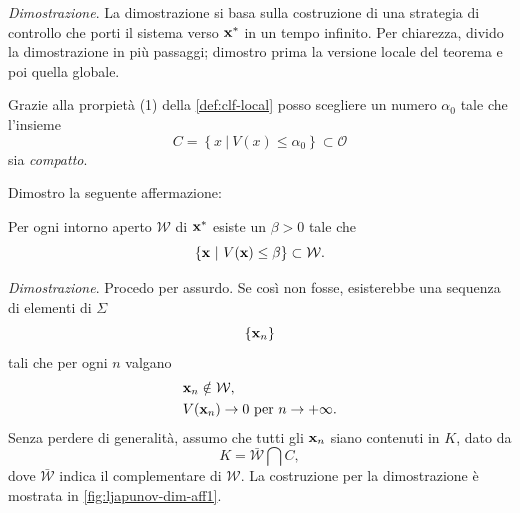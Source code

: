 \emph{Dimostrazione}.
La dimostrazione si basa sulla costruzione di una strategia di
controllo che porti il sistema verso $\mathbf{x}^*$ in un tempo infinito.
Per chiarezza, divido la dimostrazione in più passaggi; dimostro prima la versione locale
del teorema e poi quella globale.
\begin{steps}
    \item Grazie alla prorpietà (1) della \autoref{def:clf-local}
    posso scegliere un numero $\alpha_0$ tale che l'insieme
    \begin{equation}
        C = \left\{ x\ |\ V(x) \leq \alpha_0 \right\} \subset \mathcal O
        \label{eq:alpha_0}
    \end{equation}
    sia \emph{compatto}.

    Dimostro la seguente affermazione:

    \begin{aff}
        Per ogni intorno aperto $\mathcal W$ di $\mathbf{x}^*$ esiste
        un $\beta > 0$ tale che
        \begin{equation*}
            \{\mathbf{x}\ |\ V(\mathbf{x}) \leq \beta\} \subset \mathcal W.
        \end{equation*}
    \end{aff}

    \emph{Dimostrazione}.
    Procedo per assurdo.
    Se così non fosse, esisterebbe una sequenza di elementi di $\Sigma$
    \begin{equation*}
    \{\mathbf{x}_n\}
    \end{equation*}
    tali che per ogni $n$
    valgano
    \begin{align*}
        &\mathbf{x}_n \notin \mathcal W, \\
        &V(\mathbf{x}_n) \to 0 \text{ per } n \to +\infty.
    \end{align*}
    Senza perdere di generalità, assumo che tutti gli $\mathbf{x}_n$
    siano contenuti in $K$, dato da
    \begin{equation*}
        K = \bar{\mathcal W} \bigcap C,
    \end{equation*}
    dove $\bar{\mathcal W}$ indica il complementare di $\mathcal W$.
    La costruzione per la dimostrazione è mostrata in \autoref{fig:ljapunov-dim-aff1}.


\end{steps}
